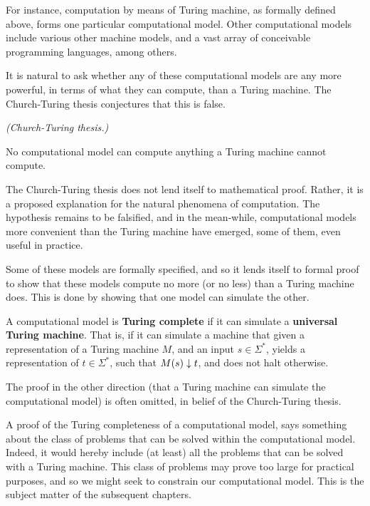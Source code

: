 For instance, computation by means of Turing machine, as formally defined
above, forms one particular computational model. Other computational models
include various other machine models, and a vast array of conceivable
programming languages, among others.

It is natural to ask whether any of these computational models are any more
powerful, in terms of what they can compute, than a Turing machine. The
Church-Turing thesis conjectures that this is false.

\begin{hypothesis} \textit{(Church-Turing thesis.)}

No computational model can compute anything a Turing machine cannot compute.

\end{hypothesis}

The Church-Turing thesis does not lend itself to mathematical proof. Rather, it
is a proposed explanation for the natural phenomena of computation. The
hypothesis remains to be falsified, and in the mean-while, computational models
more convenient than the Turing machine have emerged, some of them, even useful
in practice.

Some of these models are formally specified, and so it lends itself to formal
proof to show that these models compute no more (or no less) than a Turing
machine does. This is done by showing that one model can simulate the other.

\begin{definition} A computational model is \textbf{Turing complete} if it can
simulate a \textbf{universal Turing machine}. That is, if it can simulate a
machine that given a representation of a Turing machine $M$, and an input $s
\in \Sigma^*$, yields a representation of $t \in \Sigma^*$, such that
$M\mathopen{}\left({s}\right)\mathclose{}\downarrow t$, and does not halt otherwise. \end{definition}

The proof in the other direction (that a Turing machine can simulate the
computational model) is often omitted, in belief of the Church-Turing thesis.

A proof of the Turing completeness of a computational model, says something
about the class of problems that can be solved within the computational model.
Indeed, it would hereby include (at least) all the problems that can be solved
with a Turing machine. This class of problems may prove too large for practical
purposes, and so we might seek to constrain our computational model.  This is
the subject matter of the subsequent chapters.

